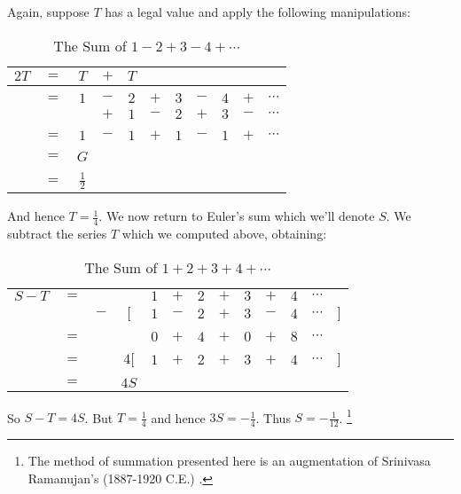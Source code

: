 \begin{example}
        Again, suppose $T$ has a legal value and apply the following
        manipulations:
        \begin{table}[H]
            \centering
            \captionsetup{type=table}
            \begin{tabular}{ccccccccccc}
                $2T$&$=$&$T$&$+$&$T$\\
                    \hline\\
                    &$=$&$1$&$-$&$2$&$+$&$3$&$-$&$4$&$+$&$\cdots$\\
                    &   &   &$+$&$1$&$-$&$2$&$+$&$3$&$-$&$\cdots$\\
                \hline\\
                    &$=$&$1$&$-$&$1$&$+$&$1$&$-$&$1$&$+$&$\cdots$\\
                \hline\\
                &$=$&$G$\\
                \hline\\
                &$=$&$\frac{1}{2}$
            \end{tabular}
            \caption{The Sum of $1-2+3-4+\cdots$}
        \end{table}
        And hence $T=\frac{1}{4}$. We now return to Euler's sum which we'll
        denote $S$. We subtract the series $T$ which we computed above,
        obtaining:
        \begin{table}[H]
            \centering
            \captionsetup{type=table}
            \begin{tabular}{ccccccccccccc}
                $S-T$&$=$&&       &$1$&$+$&$2$&$+$&$3$&$+$&$4$&$\cdots$\\
                     &&$-$&$\Big[$&$1$&$-$&$2$&$+$&$3$&$-$&$4$&$\cdots$&$\Big]$
                \\[1ex]
                \hline\\
                     &$=$&&&$0$&$+$&$4$&$+$&$0$&$+$&$8$&$\cdots$\\[1ex]
                \hline\\
                &$=$&&$4\Big[$&$1$&$+$&$2$&$+$&$3$&$+$&$4$&$\cdots$&$\Big]$
                    \\[1ex]
                \hline\\
                &$=$&&$4S$
            \end{tabular}
            \caption{The Sum of $1+2+3+4+\cdots$}
        \end{table}
        So $S-T=4S$. But $T=\frac{1}{4}$ and hence $3S=\minus\frac{1}{4}$.
        Thus $S=\minus\frac{1}{12}$.%
        \footnote{%
            The method of summation presented here is an augmentation of
            Srinivasa Ramanujan's (1887-1920 C.E.)
            \cite[Chapt.~VIII p.~3]{RamanujanNotebooksI}.
        }
    \end{example}
